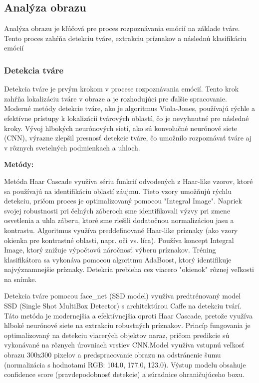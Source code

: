\subsection{Analýza obrazu}
Analýza obrazu je kľúčová pre proces rozpoznávania emócií na základe tváre. Tento proces zahŕňa detekciu tváre, extrakciu príznakov a následnú klasifikáciu emócií​
\subsubsection{Detekcia tváre}
Detekcia tváre je prvým krokom v procese rozpoznávania emócií. Tento krok zahŕňa lokalizáciu tváre v obraze a je rozhodujúci pre ďalšie spracovanie. Moderné metódy detekcie tváre, ako je algoritmus Viola-Jones,
 používajú rýchle a efektívne prístupy k lokalizácii tvárových oblastí, čo je nevyhnutné pre následné kroky​. Vývoj hlbokých neurónových sietí, ako sú konvolučné neurónové siete (CNN), výrazne zlepšil presnosť 
 detekcie tváre, čo umožnilo rozpoznávať tváre aj v rôznych svetelných podmienkach a uhloch​.\cite{article03}

\textbf{Metódy:}

Metóda Haar Cascade využíva sériu funkcií odvodených z Haar-like vzorov, ktoré sa používajú na identifikáciu oblastí záujmu. Tieto vzory umožňujú rýchlu detekciu, pričom proces je optimalizovaný pomocou 
"Integral Image". Napriek svojej robustnosti pri čelných záberoch sme identifikovali výzvy pri zmene osvetlenia a uhla záberu, ktoré sme riešili dodatočnou normalizáciou jasu a kontrastu.
Algoritmus využíva preddefinované Haar-like príznaky (ako vzory okienka pre kontrastné oblasti, napr. oči vs. líca). Používa koncept Integral Image, ktorý znižuje výpočtovú náročnosť výberu príznakov. 
Tréning klasifikátora sa vykonáva pomocou algoritmu AdaBoost, ktorý identifikuje najvýznamnejšie príznaky. Detekcia prebieha cez viacero "okienok" rôznej veľkosti na snímke.

Detekcia tváre pomocou face\_net (SSD model) využíva predtrénovaný model SSD (Single Shot MultiBox Detector) s architektúrou Caffe na detekciu tvárí. Táto metóda je modernejšia a 
efektívnejšia oproti Haar Cascade, pretože využíva hlboké neurónové siete na extrakciu robustných príznakov.
Princíp fungovania je optimalizovaný na detekciu viacerých objektov naraz, pričom predikcie sú vykonávané na rôznych úrovniach vrstiev CNN.Model využíva vstupnú veľkosť obrazu 300x300 pixelov a 
predspracovanie obrazu na odstránenie šumu (normalizácia s hodnotami RGB: 104.0, 177.0, 123.0). Výstup modelu obsahuje confidence score (pravdepodobnosť detekcie) a súradnice ohraničujúceho boxu.

